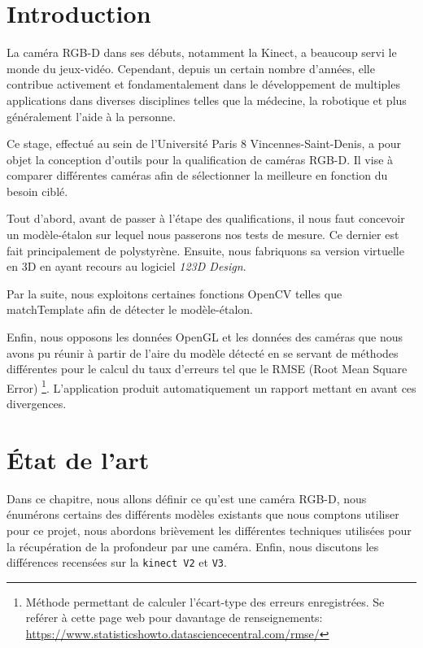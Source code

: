 \documentclass[a4paper, 12pt]{book}
\newcounter{program}[subsection]
\begin{document}
\tableofcontents
\listoffigures
\mainmatter
\chapter*{Introduction}
La caméra RGB-D dans ses débuts, notamment la Kinect, a beaucoup servi le monde du jeux-vidéo. Cependant, depuis un certain nombre d'années, elle contribue activement et fondamentalement dans le développement de multiples applications dans diverses disciplines telles que la médecine, la robotique et plus généralement l'aide à la personne.
\par Ce stage, effectué au sein de l'Université Paris 8 Vincennes-Saint-Denis, a pour objet la conception d'outils pour la qualification de caméras RGB-D. Il vise à comparer différentes caméras afin de sélectionner la meilleure en fonction du besoin ciblé.
\par Tout d'abord, avant de passer à l'étape des qualifications,  il nous faut concevoir un modèle-étalon sur lequel nous passerons nos tests de mesure. Ce dernier est fait principalement de polystyrène. Ensuite,   nous fabriquons sa version virtuelle en 3D en ayant recours au logiciel \emph{123D Design}.
\par Par la suite, nous exploitons certaines fonctions OpenCV telles que matchTemplate afin de détecter le modèle-étalon.
\par Enfin, nous opposons les données OpenGL et les données des caméras que nous avons pu réunir à partir de l'aire du modèle détecté en se servant de méthodes différentes pour le calcul du taux d'erreurs tel que le RMSE (Root Mean Square Error) \footnote{Méthode permettant de calculer l'écart-type des erreurs enregistrées. Se reférer à cette page web pour davantage de renseignements: \url{https://www.statisticshowto.datasciencecentral.com/rmse/}}. L'application produit automatiquement un rapport mettant en avant ces divergences.
\chapter{État de l'art}

Dans ce chapitre, nous allons définir ce qu'est une caméra RGB-D, nous énumérons certains des différents modèles existants que nous comptons utiliser pour ce projet, nous abordons brièvement les différentes techniques utilisées pour la récupération de la profondeur par une caméra. Enfin, nous discutons les différences recensées sur la \texttt{kinect V2} et \texttt{V3}.
\end{document}

